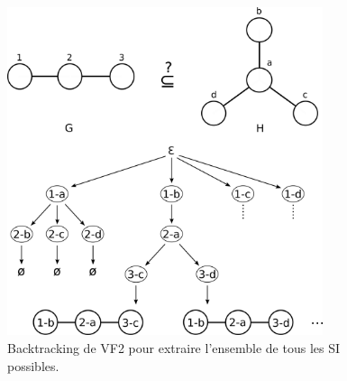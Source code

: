 % 
%     
%       
%       

\begin{figure}[!ht]
  \begin{center}
    \includegraphics[width=350px]{Figures/s2m/recherche/VF2.png}
    \caption{\label{vf2}Backtracking de VF2 pour extraire l'ensemble de tous les SI possibles.}
  \end{center}
\end{figure}

